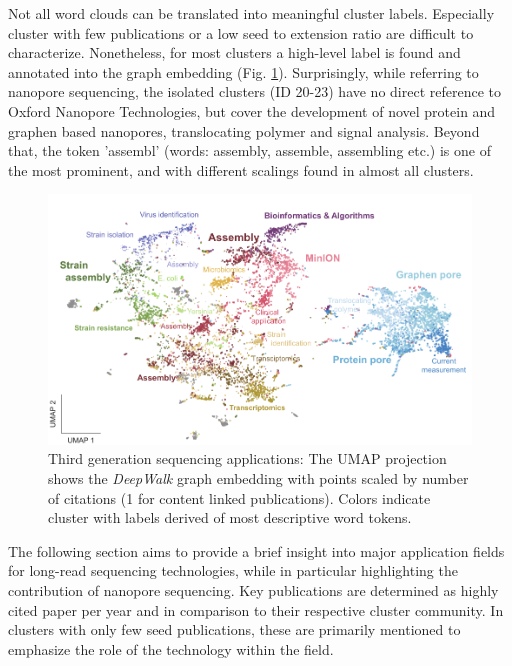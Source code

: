 Not all word clouds can be translated into meaningful cluster labels.
Especially cluster with few publications or a low seed to extension ratio are difficult to characterize.
Nonetheless, for most clusters a high-level label is found and annotated into the graph embedding (Fig. \ref{fig:state_of_art:umap_cluster}).
Surprisingly, while referring to nanopore sequencing, the isolated clusters (ID 20-23) have no direct reference to Oxford Nanopore Technologies, but cover the development of novel protein and graphen based nanopores, translocating polymer and signal analysis.
Beyond that, the token 'assembl' (words: assembly, assemble, assembling etc.) is one of the most prominent, and with different scalings found in almost all clusters.

\begin{figure}[h]
	\centering
	\includegraphics[width=1.0\textwidth]{figures/state_of_art/umap_cluster.pdf}
	\captionsetup{format=plain}
	\caption[Third generation sequencing applications]{Third generation sequencing applications: The UMAP projection shows the \textit{DeepWalk} graph embedding with points scaled by number of citations (1 for content linked publications). Colors indicate cluster with labels derived of most descriptive word tokens.}
	\label{fig:state_of_art:umap_cluster}
\end{figure}

The following section aims to provide a brief insight into major application fields for long-read sequencing technologies, while in particular highlighting the contribution of nanopore sequencing.
Key publications are determined as highly cited paper per year and in comparison to their respective cluster community.
In clusters with only few seed publications, these are primarily mentioned to emphasize the role of the technology within the field.

